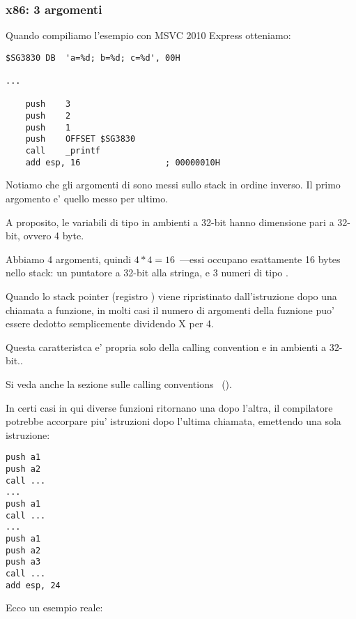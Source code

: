 \subsubsection{x86: 3 argomenti}


Quando compiliamo l'esempio con MSVC 2010 Express otteniamo:

\begin{lstlisting}[style=customasmx86]
$SG3830	DB	'a=%d; b=%d; c=%d', 00H

...

	push	3
	push	2
	push	1
	push	OFFSET $SG3830
	call	_printf
	add	esp, 16					; 00000010H
\end{lstlisting}

Notiamo che gli argomenti di \printf sono messi sullo stack in ordine inverso. Il primo argomento e' quello messo per ultimo.

A proposito, le variabili di tipo \Tint in ambienti a 32-bit hanno dimensione pari a 32-bit, ovvero 4 byte.

Abbiamo 4 argomenti, quindi $4*4 = 16$~---essi occupano esattamente 16 bytes nello stack: un puntatore a 32-bit alla stringa,  e 3 numeri di tipo \Tint.

Quando lo \gls{stack pointer} (registro \ESP) viene ripristinato dall'istruzione 
dopo una chiamata a funzione, in molti casi il numero di argomenti della fuznione puo' essere dedotto semplicemente dividendo X per 4.

Questa caratteristca  e' propria solo della calling convention  e in ambienti a 32-bit..

Si veda anche la sezione sulle calling conventions ~().

In certi casi in qui diverse funzioni ritornano una dopo l'altra, il compilatore potrebbe accorpare piu' istruzioni  
dopo l'ultima chiamata, emettendo una sola istruzione:

\begin{lstlisting}[style=customasmx86]
push a1
push a2
call ...
...
push a1
call ...
...
push a1
push a2
push a3
call ...
add esp, 24
\end{lstlisting}

Ecco un esempio reale:



